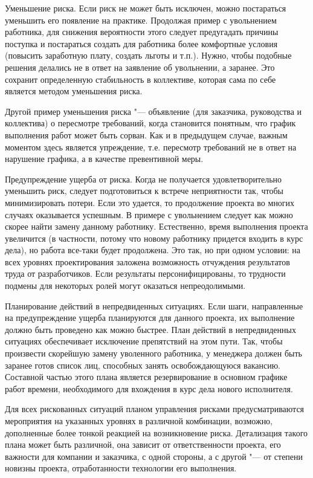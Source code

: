 \documentclass{../industrial-development}
\begin{document}
Уменьшение риска. Если риск не может быть исключен, можно постараться уменьшить его появление на практике. Продолжая пример с увольнением работника, для снижения вероятности этого следует предугадать причины поступка и постараться создать для работника более комфортные условия (повысить заработную плату, создать льготы и т.п.). Нужно, чтобы подобные решения делались не в ответ на заявление об увольнении, а заранее. Это сохранит определенную стабильность в коллективе, которая сама по себе является методом уменьшения риска.

Другой пример уменьшения риска "--- объявление (для заказчика, руководства и коллектива) о пересмотре требований, когда становится понятным, что график выполнения работ может быть сорван. Как и в предыдущем случае, важным моментом здесь является упреждение, т.е. пересмотр требований не в ответ на нарушение графика, а в качестве превентивной меры.

Предупреждение ущерба от риска. Когда не получается удовлетворительно уменьшить риск, следует подготовиться к встрече неприятности так, чтобы минимизировать потери. Если это удается, то продолжение проекта во многих случаях оказывается успешным. В примере с увольнением следует как можно скорее найти замену данному работнику. Естественно, время выполнения проекта увеличится (в частности, потому что новому работнику придется входить в курс дела), но работа все-таки будет продолжена. Это так, но при одном условии: на всех уровнях проектирования заложена возможность отчуждения результатов труда от разработчиков. Если результаты персонифицированы, то трудности подмены для некоторых ролей могут оказаться непреодолимыми.

Планирование действий в непредвиденных ситуациях. Если шаги, направленные на предупреждение ущерба планируются для данного проекта, их выполнение должно быть проведено как можно быстрее. План действий в непредвиденных ситуациях обеспечивает исключение препятствий на этом пути. Так, чтобы произвести скорейшую замену уволенного работника, у менеджера должен быть заранее готов список лиц, способных занять освобождающуюся вакансию. Составной частью этого плана является резервирование в основном графике работ времени, необходимого для вхождения в курс дела нового исполнителя.

Для всех рискованных ситуаций планом управления рисками предусматриваются мероприятия на указанных уровнях в различной комбинации, возможно, дополненные более тонкой реакцией на возникновение риска. Детализация такого плана может быть различной, она зависит от ответственности проекта, его важности для компании и заказчика, с одной стороны, а с другой "--- от степени новизны проекта, отработанности технологии его выполнения.
\end{document}
